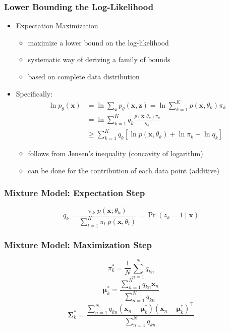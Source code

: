 \documentclass[conference,11pt]{IEEEtran}
\newcommand{\matr}[1]{\boldsymbol{\mathbf{#1}}}
\newcommand{\vect}[1]{\boldsymbol{\mathbf{#1}}}
\newcommand{\trns}[1]{#1^{\top}}
\begin{document}
\subsubsection{Lower Bounding the Log-Likelihood}
\begin{itemize}
  \item Expectation Maximization
    \begin{itemize}
      \item maximize a lower bound on the log-likelihood
      \item systematic way of deriving a family of bounds
      \item based on complete data distribution
    \end{itemize}
  \item Specifically:
    \begin{align*}
      \ln p_{\theta}(\vect{x}) &= \ln \sum_{\vect{z}} p_{\theta}(\vect{x},
      \vect{z}) = \ln \sum_{k=1}^K p(\vect{x}, \theta_k) \pi_k \\
      &= \ln \sum_{k=1}^K q_k \frac{p(\vect{x}; \theta_k) \pi_k}{q_k} \\
      &\geq \sum_{k=1}^K q_k \left[\ln p(\vect{x},\theta_k)+\ln\pi_k-\ln q_k \right]
    \end{align*}
    \begin{itemize}
      \item follows from Jensen's inequality (concavity of logarithm)
      \item can be done for the contribution of each data point (additive)
    \end{itemize}
\end{itemize}

\subsubsection{Mixture Model: Expectation Step}
\[
  q_k = \frac{\pi_k\; p(\vect{x}; \theta_k)}{\sum_{l=1}^K \pi_l\;p(\vect{x}, \theta_l)}
  = \Pr(z_k = 1 \mid \vect{x})
\]

\subsubsection{Mixture Model: Maximization Step}
\[ \pi_k^* = \frac{1}{N} \sum_{n=1}^N q_{kn} \]
\[ \vect{\mu}_k^* = \frac{\sum_{n=1}^N q_{kn}\vect{x}_n}{\sum_{n=1}^N q_{kn}} \]
\[
  \matr{\Sigma}_k^* = \frac{\sum_{n=1}^N q_{kn}(\vect{x}_n -
    \vect{\mu}_k^*)\trns{(\vect{x}_n - \vect{\mu}_k^*)}}{\sum_{n=1}^N q_{kn}}
\]
\end{document}

